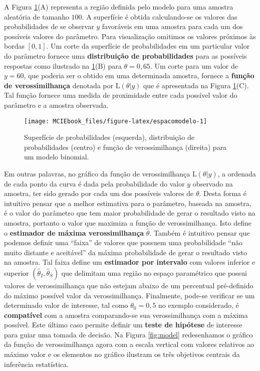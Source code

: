 \documentclass[
  9pt,
  a5paper,
]{book}
\theoremstyle{definition}
\theoremstyle{definition}
\theoremstyle{definition}
\theoremstyle{definition}
\theoremstyle{remark}
\begin{document}
A Figura \ref{fig:espacomodelo}(A) representa a região definida pelo modelo para uma amostra aleatória de tamanho \(100\).
A superfície é obtida calculando-se os valores das probabilidades de se observar \(y\) favoráveis em uma amostra para cada um dos possíveis valores do parâmetro. Para visualização omitimos os valores próximos às bordas \([0,1]\).
Um corte da superfície de probabilidades em um particular valor do parâmetro
fornece uma \textbf{distribuição de probabilidades} para as possíveis respostas
como ilustrado na \ref{fig:espacomodelo}(B) para \(\theta=0,65\).
Um corte para um valor de \(y=60\), que poderia ser o obtido em uma determinada amostra, fornece a \textbf{função de verossimilhança} denotada por \(\mathrm{L}(\theta|y)\) que é apresentada na
Figura \ref{fig:espacomodelo}(C). Tal função fornece uma medida de proximidade entre cada possível valor do parâmetro e a amostra observada.

\begin{figure}[h]

{\centering \texttt{[image: MCIEbook\_files/figure-latex/espacomodelo-1]} 

}

\caption{Superfície de probabilidades (esquerda), distribuição de probabilidades (centro) e função de verossimilhança (direita) para um modelo binomial.}\label{fig:espacomodelo}
\end{figure}

Em outras palavras, no gráfico da função de verossimilhança \(\mathrm{L}(\theta|y)\),
a ordenada de cada ponto da curva é dada pela probabilidade do valor \(y\) observado na amostra, ter sido gerado por cada um dos possíveis valores de \(\theta\). Desta forma é intuitivo pensar que a melhor estimativa para o parâmetro, baseada na amostra, é o valor do parâmetro que tem maior probabilidade de gerar o resultado visto na amostra, portanto o valor
que maximiza a função de verossimilhança. Isto define o \textbf{estimador de máxima verossimilhança} \(\hat{\theta}\).
Também é intuitivo pensar que podemos definir uma ``faixa'' de valores
que possuem uma probabilidade ``não muito distante e aceitável'' da máxima
probabilidade de gerar o resultado visto na amostra.
Tal faixa define um \textbf{estimador por intervalo} com valores inferior e superior \((\hat{\theta}_I, \hat{\theta}_S)\) que delimitam
uma região no espaço paramétrico que possui valores de verossimilhança
que não estejam abaixo de um percentual pré-definido do máximo possível
valor da verossimilhança.
Finalmente, pode-se verificar se um determinado valor de interesse, tal como \(\theta_0 = 0,5\) no exemplo considerado,
é \textbf{compatível} com a amostra comparando-se sua verossimilhança
com a máxima possível. Este último caso permite definir um \textbf{teste de hipótese} de interesse para guiar uma tomada de decisão.
Na Figura \ref{fig:model} redesenhamos o gráfico da função de verossimilhança
agora com a escala vertical com valores relativos ao máximo valor e os elementos no gráfico ilustram os três objetivos centrais da inferência estatística.
\end{document}
